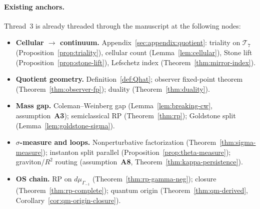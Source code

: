 \paragraph{Existing anchors.}
Thread~3 is already threaded through the manuscript at the following nodes:
\begin{itemize}[leftmargin=*]
  \item \textbf{Cellular $\to$ continuum.}
    Appendix~\ref{sec:appendix:quotient}: triality on $\mathcal{T}_7$
    (Proposition~\ref{prop:triality}), cellular count
    (Lemma~\ref{lem:cellular}), Stone lift
    (Proposition~\ref{prop:stone-lift}), Lefschetz index
    (Theorem~\ref{thm:mirror-index}).
  \item \textbf{Quotient geometry.}
    Definition~\ref{def:Qhat}; observer fixed-point theorem
    (Theorem~\ref{thm:observer-fp}); duality
    (Theorem~\ref{thm:duality}).
  \item \textbf{Mass gap.}
    Coleman--Weinberg gap (Lemma~\ref{lem:breaking-cw}, assumption~\textbf{A3});
    semiclassical RP (Theorem~\ref{thm:rp}); Goldstone split
    (Lemma~\ref{lem:goldstone-sigma}).
  \item \textbf{$\sigma$-measure and loops.}
    Nonperturbative factorization (Theorem~\ref{thm:sigma-measure});
    instanton split parallel (Proposition~\ref{prop:theta-measure});
    graviton/$R^2$ routing (assumption~\textbf{A8},
    Theorem~\ref{thm:kappa-persistence}).
  \item \textbf{OS chain.}
    RP on $d\mu_{\Gamma_{-1}}$ (Theorem~\ref{thm:rp-gamma-neg});
    closure (Theorem~\ref{thm:rp-complete});
    quantum origin (Theorem~\ref{thm:qm-derived},
    Corollary~\ref{cor:qm-origin-closure}).
\end{itemize}

